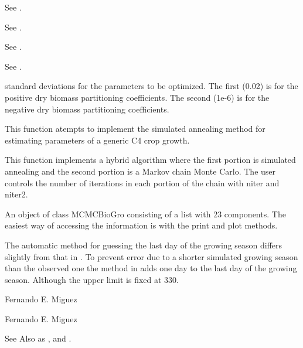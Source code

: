 \documentclass[letterpaper]{book}
\begin{document}
\begin{Arguments}
\begin{ldescription}
\item[\code{phenoControl}] See .

\item[\code{soilControl}] See .

\item[\code{nitroControl}] See .

\item[\code{centuryControl}] See .

\item[\code{sd}] standard deviations for the parameters to be
optimized. The first (0.02) is for the positive dry
biomass partitioning coefficients. The second (1e-6) is
for the negative dry biomass partitioning coefficients.
\end{ldescription}
\end{Arguments}
%
\begin{Details}\relax
This function atempts to implement the simulated
annealing method for estimating parameters of a generic
C4 crop growth.

This function implements a hybrid algorithm where the
first portion is simulated annealing and the second
portion is a Markov chain Monte Carlo. The user controls
the number of iterations in each portion of the chain
with niter and niter2.
\end{Details}
%
\begin{Value}
An object of class MCMCBioGro consisting of a list with
23 components.  The easiest way of accessing the
information is with the print and plot methods.
\end{Value}
%
\begin{Note}\relax
The automatic method for guessing the last day of the
growing season differs slightly from that in
. To prevent error due to a shorter
simulated growing season than the observed one the method
in  adds one day to the last day of the
growing season. Although the upper limit is fixed at 330.
\end{Note}
%
\begin{Author}\relax
Fernando E. Miguez

Fernando E. Miguez
\end{Author}
%
\begin{SeeAlso}\relax
See Also as , 
and .
\end{SeeAlso}
\end{document}
